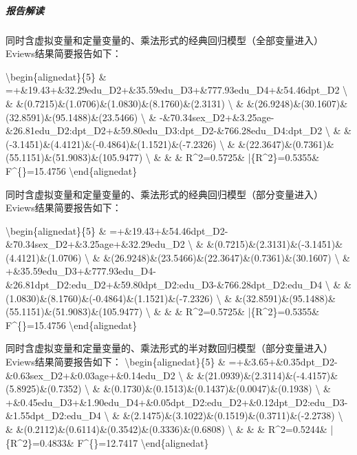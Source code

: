 \documentclass[12pt,(landscape,a4paper),(portrait,a4paper)]{article}
\let\oldsubparagraph\subparagraph
\renewcommand{\subparagraph}[1]{\oldsubparagraph{#1}\mbox{}}
\theoremstyle{definition}
\theoremstyle{definition}
\theoremstyle{definition}
\theoremstyle{remark}
\begin{document}
\hypertarget{-3}{%
\subparagraph{报告解读}\label{-3}}

同时含虚拟变量和定量变量的、乘法形式的经典回归模型（全部变量进入）Eviews结果简要报告如下：

\textbackslash{}begin\{alignedat\}\{5\} \&
=+\&19.43+\&32.29edu\_D2+\&35.59edu\_D3+\&777.93edu\_D4+\&54.46dpt\_D2
\textbackslash{} \&
\&(0.7215)\&(1.0706)\&(1.0830)\&(8.1760)\&(2.3131)
\textbackslash{} \&
\&(26.9248)\&(30.1607)\&(32.8591)\&(95.1488)\&(23.5466)
\textbackslash{} \&
\quad-\&70.34sex\_D2+\&3.25age-\&26.81edu\_D2:dpt\_D2+\&59.80edu\_D3:dpt\_D2-\&766.28edu\_D4:dpt\_D2
\textbackslash{} \&
\&(-3.1451)\&(4.4121)\&(-0.4864)\&(1.1521)\&(-7.2326)
\textbackslash{} \&
\&(22.3647)\&(0.7361)\&(55.1151)\&(51.9083)\&(105.9477)
\textbackslash{} \& \& \quad\& R\^{}2=0.5725\&
\bar\{R\^{}2\}=0.5355\& F\^{}\{\ast\}=15.4756
\textbackslash{}end\{alignedat\}

同时含虚拟变量和定量变量的、乘法形式的经典回归模型（部分变量进入）Eviews结果简要报告如下：

\textbackslash{}begin\{alignedat\}\{5\} \&
=+\&19.43+\&54.46dpt\_D2-\&70.34sex\_D2+\&3.25age+\&32.29edu\_D2
\textbackslash{} \&
\&(0.7215)\&(2.3131)\&(-3.1451)\&(4.4121)\&(1.0706)
\textbackslash{} \&
\&(26.9248)\&(23.5466)\&(22.3647)\&(0.7361)\&(30.1607)
\textbackslash{} \&
\quad+\&35.59edu\_D3+\&777.93edu\_D4-\&26.81dpt\_D2:edu\_D2+\&59.80dpt\_D2:edu\_D3-\&766.28dpt\_D2:edu\_D4
\textbackslash{} \&
\&(1.0830)\&(8.1760)\&(-0.4864)\&(1.1521)\&(-7.2326)
\textbackslash{} \&
\&(32.8591)\&(95.1488)\&(55.1151)\&(51.9083)\&(105.9477)
\textbackslash{} \& \& \quad\& R\^{}2=0.5725\&
\bar\{R\^{}2\}=0.5355\& F\^{}\{\ast\}=15.4756
\textbackslash{}end\{alignedat\}

同时含虚拟变量和定量变量的、乘法形式的半对数回归模型（部分变量进入）Eviews结果简要报告如下：
\textbackslash{}begin\{alignedat\}\{5\} \&
=+\&3.65+\&0.35dpt\_D2-\&0.63sex\_D2+\&0.03age+\&0.14edu\_D2
\textbackslash{} \&
\&(21.0939)\&(2.3114)\&(-4.4157)\&(5.8925)\&(0.7352)
\textbackslash{} \&
\&(0.1730)\&(0.1513)\&(0.1437)\&(0.0047)\&(0.1938)
\textbackslash{} \&
\quad+\&0.45edu\_D3+\&1.90edu\_D4+\&0.05dpt\_D2:edu\_D2+\&0.12dpt\_D2:edu\_D3-\&1.55dpt\_D2:edu\_D4
\textbackslash{} \&
\&(2.1475)\&(3.1022)\&(0.1519)\&(0.3711)\&(-2.2738)
\textbackslash{} \&
\&(0.2112)\&(0.6114)\&(0.3542)\&(0.3336)\&(0.6808)
\textbackslash{} \& \& \quad\& R\^{}2=0.5244\&
\bar\{R\^{}2\}=0.4833\& F\^{}\{\ast\}=12.7417
\textbackslash{}end\{alignedat\}
\end{document}
